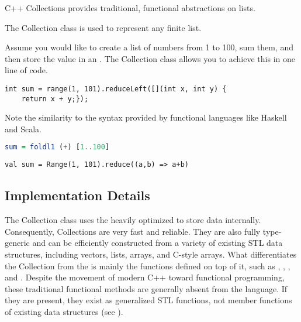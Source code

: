 
C++ Collections provides traditional, functional abstractions on lists.

The Collection class is used to represent any finite list.

Assume you would like to create a list of numbers from 1 to 100, sum them, and then store the value in an .
The Collection class allows you to achieve this in one line of code.

\begin{lstlisting}
int sum = range(1, 101).reduceLeft([](int x, int y) {
    return x + y;});
\end{lstlisting}

Note the similarity to the syntax provided by functional languages like Haskell and Scala.

\begin{lstlisting}[language=haskell]
sum = foldl1 (+) [1..100]
\end{lstlisting}

\begin{lstlisting}
val sum = Range(1, 101).reduce((a,b) => a+b)
\end{lstlisting}

\subsection{Implementation Details}

The Collection class uses the heavily optimized  to store data internally.
Consequently, Collections are very fast and reliable.
They are also fully type-generic and can be efficiently constructed from a variety of existing STL data structures, including vectors, lists, arrays, and C-style arrays.
What differentiates the Collection from the  is mainly the functions defined on top of it, such as , , , and .
Despite the movement of modern C++ toward functional programming, these traditional functional methods are generally absent from the language.
If they are present, they exist as generalized STL functions, not member functions of existing data structures (see ).


